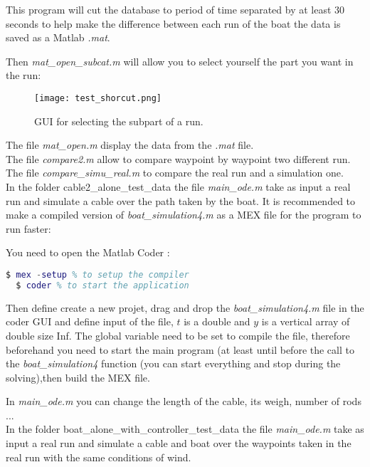 \documentclass[twoside,12pt]{report} %
\begin{document}
This program will cut the database to period of time separated by at least 30 seconds to help make the difference between each run of the boat the data is saved as a Matlab \textit{.mat}.

Then \textit{mat\_open\_subcat.m} will allow you to select yourself the part you want in the run:

\begin{figure}[H]
\centering
    \texttt{[image: test\_shorcut.png]}
    \caption*{GUI for selecting the subpart of a run.}
    \label{fig:test_shorcut}
\end{figure}

The file \textit{mat\_open.m} display the data from the \textit{.mat} file.\\
The file \textit{compare2.m} allow to compare waypoint by waypoint two different run.\\
The file \textit{compare\_simu\_real.m} to compare the real run and a simulation one.\\


In the folder cable2\_alone\_test\_data the file \textit{main\_ode.m}  take as input a real run and simulate
a cable over the path taken by the boat. It is recommended to make a compiled version of \textit{boat\_simulation4.m} as a MEX file for the program to run faster:

You need to open the Matlab Coder :
\begin{lstlisting}[language=matlab]
  $ mex -setup % to setup the compiler
  $ coder % to start the application
\end{lstlisting}

Then define create a new projet, drag and drop the \textit{boat\_simulation4.m} file in the coder GUI and define input of the file, $t$ is a double and $y$ is a vertical array of double size Inf. The global variable need to be set to compile the file, therefore beforehand you need to start the main program (at least until before the call to the   \textit{boat\_simulation4} function (you can start everything and stop during the solving),then build the MEX file.

In \textit{main\_ode.m} you can change the length of the cable, its weigh, number of rods ... \\


In the folder boat\_alone\_with\_controller\_test\_data the file \textit{main\_ode.m}  take as input a real run and simulate
a cable and boat over the waypoints taken in the real run with the same conditions of wind. \\
\end{document}
